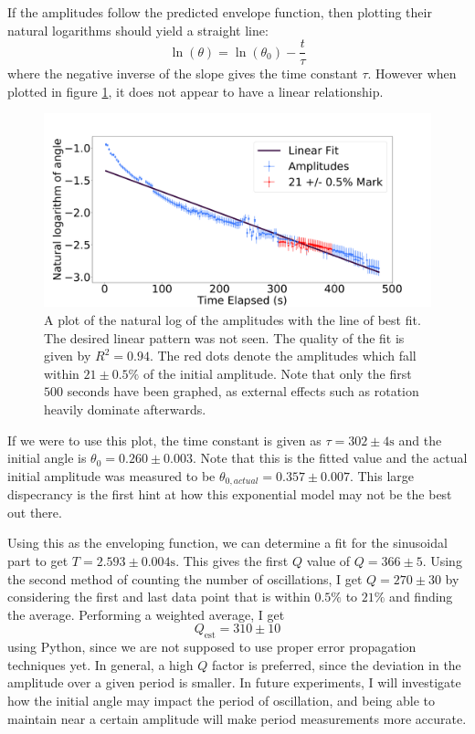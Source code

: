 \documentclass[%
 reprint,
 amsmath,amssymb
 aps,
]{revtex4-2}
\begin{document}
If the amplitudes follow the predicted envelope function, then plotting their natural logarithms should yield a straight line:
\begin{equation}
    \ln(\theta)=\ln(\theta_0)-\frac{t}{\tau}
    \label{eq:}
\end{equation}
where the negative inverse of the slope gives the time constant $\tau$. However when plotted in figure \ref{fig:amplitude-vs-time}, it does not appear to have a linear relationship.
\begin{figure}[!h]
    \includegraphics[width=\linewidth]{figures/amplitude-vs-time-fitted.png}

    \caption{A plot of the natural log of the amplitudes with the line of best fit. The desired linear pattern was not seen. The quality of the fit is given by $R^2=0.94$. The red dots denote the amplitudes which fall within $21 \pm 0.5\%$ of the initial amplitude. Note that only the first $500$ seconds have been graphed, as external effects such as rotation heavily dominate afterwards.}
    \label{fig:amplitude-vs-time}
\end{figure}
If we were to use this plot, the time constant is given as $\tau = 302 \pm 4 \si{\second}$ and the initial angle is $\theta_0 = 0.260 \pm 0.003$. Note that this is the fitted value and the actual initial amplitude was measured to be $\theta_{0,actual}=0.357 \pm 0.007$. This large dispecrancy is the first hint at how this exponential model may not be the best out there. 

Using this as the enveloping function, we can determine a fit for the sinusoidal part to get $T=2.593 \pm 0.004 \si{\second}$. This gives the first $Q$ value of $Q=366\pm 5$. Using the second method of counting the number of oscillations, I get $Q=270 \pm 30$ by considering the first and last data point that is within $0.5\%$ to $21\%$ and finding the average. Performing a weighted average, I get
\begin{equation}
    Q_\text{est} = 310 \pm 10
    \label{eq:}
\end{equation}
using Python, since we are not supposed to use proper error propagation techniques yet. In general, a high $Q$ factor is preferred, since the deviation in the amplitude over a given period is smaller. In future experiments, I will investigate how the initial angle may impact the period of oscillation, and being able to maintain near a certain amplitude will make period measurements more accurate.
\end{document}
